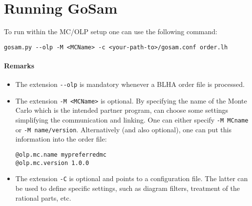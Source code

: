 \section{Running GoSam}
To run \gosam{} within the MC/OLP setup one can use the following command:\\
\begin{lstlisting}[style=sh]
gosam.py --olp -M <MCName> -c <your-path-to>/gosam.conf order.lh
\end{lstlisting}

\paragraph{Remarks}
\begin{itemize}
\item The extension \lstinline[style=sh]|--olp| is mandatory whenever 
   a BLHA order file is processed.
\item The extension \lstinline[style=sh]|-M <MCName>| is optional. By specifying the
   name of the Monte Carlo which is the intended partner program,
   \gosam{} can choose some settings simplifying the communication and linking.
   One can either specify \lstinline[style=sh]|-M MCname| or \lstinline[style=sh]|-M name/version|.
   Alternatively (and also optional),
   one can put this information into the order file:\\
\begin{lstlisting}[style=in]
@olp.mc.name mypreferredmc
@olp.mc.version 1.0.0
\end{lstlisting}
\item The extension \lstinline[style=sh]|-C| is optional and points to a \gosam{} configuration file.
   The latter can be used to define \gosam{} specific settings, such as  
   diagram filters, treatment of the rational parts, etc.
   

\end{itemize}
